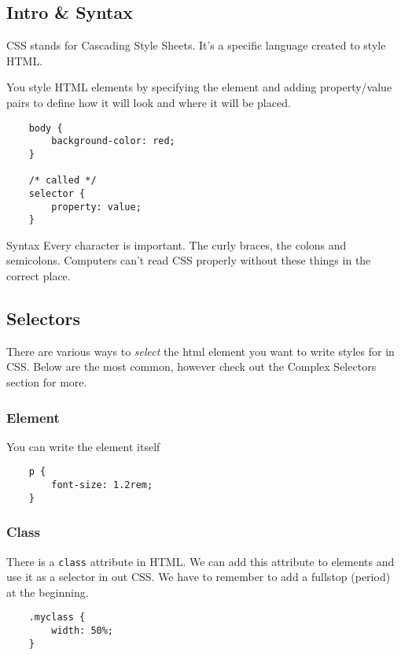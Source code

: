 \subsection{Intro \& Syntax}

CSS stands for Cascading Style Sheets. It's a specific language created to style HTML.

You style HTML elements by specifying the element and adding property/value pairs to define how it will look and where it will be placed.


\begin{verbatim}
    body {
        background-color: red;
    }

    /* called */
    selector {
        property: value;
    }
\end{verbatim}

\begin{infobox}{Syntax}
    Every character is important. The curly braces, the colons and semicolons. Computers can't read CSS properly without these things in the correct place.
\end{infobox}

\subsection{Selectors}

There are various ways to \textit{select} the html element you want to write styles for in CSS. Below are the most common, however check out the Complex Selectors section for more.

\subsubsection{Element}

You can write the element itself

\begin{verbatim}
    p {
        font-size: 1.2rem;
    }
\end{verbatim}

\subsubsection{Class}

There is a \texttt{class} attribute in HTML. We can add this attribute to elements and use it as a selector in out CSS. We have to remember to add a fullstop (period) at the beginning.

\begin{verbatim}
    .myclass {
        width: 50%;
    }
\end{verbatim}

